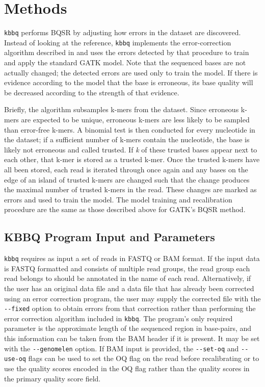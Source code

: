 \section{Methods}
\texttt{kbbq} performs BQSR by adjusting how errors in the dataset are discovered.
Instead of looking at the reference, \texttt{kbbq} implements the error-correction algorithm described in \cite{song_lighter_2014} and uses the errors detected by that procedure to train and apply the standard GATK model. Note that the sequenced bases are not actually changed; the detected errors are used only to train the model. If there is evidence according to the model that the base is erroneous, its base quality will be decreased according to the strength of that evidence.

Briefly, the algorithm subsamples k-mers from the dataset. Since erroneous k-mers are expected to be unique, erroneous k-mers are less likely to be sampled than error-free k-mers. A binomial test is then conducted for every nucleotide in the dataset; if a sufficient number of k-mers contain the nucleotide, the base is likely not erroneous and called trusted. If \textit{k} of these trusted bases appear next to each other, that k-mer is stored as a trusted k-mer. Once the trusted k-mers have all been stored, each read is iterated through once again and any bases on the edge of an island of trusted k-mers are changed such that the change produces the maximal number of trusted k-mers in the read. These changes are marked as errors and used to train the model.
The model training and recalibration procedure are the same as those described above for GATK's BQSR method.

\subsection{KBBQ Program Input and Parameters}

\texttt{kbbq} requires as input a set of reads in FASTQ \parencite{cock_sanger_2010} or BAM \parencite{li_sequence_2009} format. If the input data is FASTQ formatted and consists of multiple read groups, the read group each read belongs to should be annotated in the name of each read. Alternatively, if the user has an original data file and a data file that has already been corrected using an error correction program, the user may supply the corrected file with the \texttt{-\phantom{}-fixed} option to obtain errors from that correction rather than performing the error correction algorithm included in \texttt{kbbq}. The program's only required parameter is the approximate length of the sequenced region in base-pairs, and this information can be taken from the BAM header if it is present. It may be set with the \texttt{-\phantom{}-genomelen} option. If BAM input is provided, the \texttt{-\phantom{}-set-oq} and \texttt{-\phantom{}-use-oq} flags can be used to set the OQ flag on the read before recalibrating or to use the quality scores encoded in the OQ flag rather than the quality scores in the primary quality score field.

